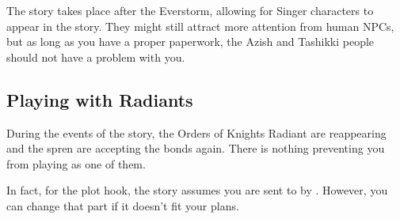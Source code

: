 The story takes place after the Everstorm, allowing for Singer characters to appear in the story. They might still attract more attention from human NPCs, but as long as you have a proper paperwork, the Azish and Tashikki people should not have a problem with you.



\subsection{Playing with Radiants}

During the events of the story, the Orders of Knights Radiant are reappearing and the spren are accepting the bonds again. There is nothing preventing you from playing as one of them. 

In fact, for the plot hook, the story assumes you are sent to \locationTashikk{} by \npcDalinar{}. However, you can change that part if it doesn't fit your plans.



